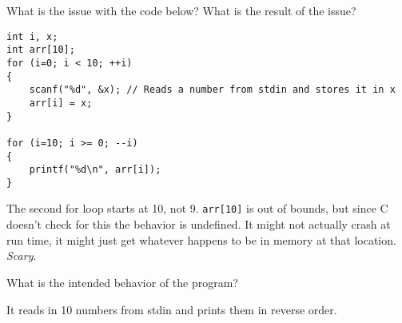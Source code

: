 What is the issue with the code below? What is the result of the issue?

\begin{lstlisting}
int i, x;
int arr[10];
for (i=0; i < 10; ++i)
{
	scanf("%d", &x); // Reads a number from stdin and stores it in x
	arr[i] = x;
}

for (i=10; i >= 0; --i)
{
	printf("%d\n", arr[i]);
}
\end{lstlisting}
\begin{answer}
The second for loop starts at 10, not 9.
\texttt{arr[10]} is out of bounds, but since C doesn't check for this the behavior is undefined.
It might not actually crash at run time, it might just get whatever happens to be in memory at that location.
\emph{Scary}.
\end{answer}

\item What is the intended behavior of the program?

\begin{answer}
It reads in 10 numbers from stdin and prints them in reverse order.
\end{answer}

